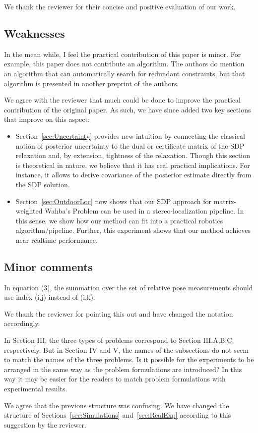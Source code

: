 \begin{response}
We thank the reviewer for their concise and positive evaluation of our work. 
\end{response}

\subsection*{Weaknesses}
In the mean while, I feel the practical contribution of this paper is minor. For example, this paper does not contribute an algorithm. The authors do mention an algorithm that can automatically search for redundant constraints, but that algorithm is presented in another preprint of the authors. 
\begin{response}
We agree with the reviewer that much could be done to improve the practical contribution of the original paper. As such, we have since added two key sections that improve on this aspect:
\begin{itemize}
    \item Section~\ref{sec:Uncertainty} provides new intuition by connecting the classical notion of posterior uncertainty to the dual or certificate matrix of the SDP relaxation and, by extension, tightness of the relaxation. Though this section is theoretical in nature, we believe that it has real practical implications. For instance, it allows to derive covariance of the posterior estimate directly from the SDP solution.
    \item Section~\ref{sec:OutdoorLoc} now shows that our SDP approach for matrix-weighted Wahba's Problem can be used in a stereo-localization pipeline. In this sense, we show how our method can fit into a practical robotics algorithm/pipeline. Further, this experiment shows that our method achieves near realtime performance.
\end{itemize}
\end{response}

\subsection*{Minor comments}
In equation (3), the summation over the set of relative pose measurements should use index (i,j) instead of (i,k).
\begin{response}
    We thank the reviewer for pointing this out and have changed the notation accordingly.
\end{response}

In Section III, the three types of problems correspond to Section III.A,B,C, respectively. But in Section IV and V, the names of the subsections do not seem to match the names of the three problems. Is it possible for the experiments to be arranged in the same way as the problem formulations are introduced? In this way it may be easier for the readers to match problem formulations with experimental results. 
\begin{response}
    We agree that the previous structure was confusing. We have changed the structure of Sections~\ref{sec:Simulations} and~\ref{sec:RealExp} according to this suggestion by the reviewer.
\end{response}

